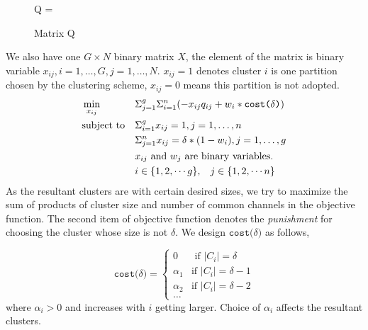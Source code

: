 \begin{figure}[ht!]
\centering
Q = 	
\caption{Matrix Q}
\label{xx}
\end{figure}

We also have one $G\times N$ binary matrix $X$, the element of the matrix is binary variable $x_{ij},i=1, \ldots, G, j=1, \ldots, N$.
$x_{ij}=1$ denotes cluster $i$ is one partition chosen by the clustering scheme, $x_{ij}=0$ means this partition is not adopted.
\begin{equation}
\begin{aligned}
     &\min\limits_{x_{ij}} && \Sigma_{j=1}^g\Sigma_{i=1}^n (-x_{ij}q_{ij} + w_i*\texttt{cost($\delta$)}) \\
     &\text{subject to}   && \Sigma_{i=1}^g x_{ij} = 1,  j=1, \ldots, n \\
   &&& \Sigma_{j=1}^n x_{ij} = \delta*(1-w_i), j=1, \ldots, g \\
   &&& \text{$x_{ij}$ and $w_j$ are binary variables.}\\
   &&& i\in \{1,2, \cdots g\}, \hspace{0.3cm} j\in \{1,2,\cdots n\}
\notag
\end{aligned}
\end{equation}
As the resultant clusters are with certain desired sizes, we try to maximize the sum of products of cluster size and number of common channels in the objective function.
The second item of objective function denotes the \textit{punishment} for choosing the cluster whose size is not $\delta$.
We design $\texttt{cost($\delta$)}$ as follows,

$$
\texttt{cost($\delta$)} = \left\{ \begin{array}{rl}
0 &\mbox{ if $|C_i|=\delta$} \\
\alpha_1 &\mbox{if $|C_i|=\delta-1$} \\
\alpha_2 &\mbox{if $|C_i|=\delta-2$} \\
\dots
\end{array} \right.
$$
where $\alpha_i>0$ and increases with $i$ getting larger.
Choice of $\alpha_i$ affects the resultant clusters.

